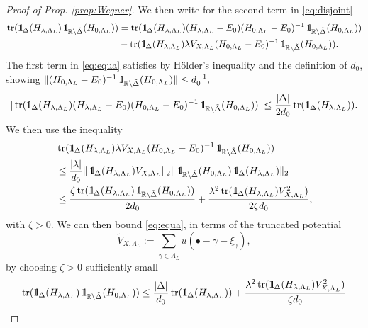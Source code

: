 \documentclass[reqno,12pt,letterpaper]{amsart}
\newcommand{\RR}{{\mathbb R}}
\numberwithin{equation}{section}
\DeclareMathOperator{\tr}{tr}
\def\indic{\operatorname{1\hskip-2.75pt\relax l}}
\begin{document}
\begin{proof}[Proof of Prop. \ref{prop:Wegner}]
We then write for the second term in \eqref{eq:disjoint}
\begin{equation}
\label{eq:equa}
\begin{split}  \tr(\indic_{\Delta}(H_{\lambda,\Lambda_L}) \indic_{\RR \setminus \tilde \Delta}(H_{0,\Lambda_L}) ) &=  \tr(\indic_{\Delta}(H_{\lambda,\Lambda_L})(H_{\lambda,\Lambda_L}-E_0)(H_{0,\Lambda_L}-E_0)^{-1} \indic_{\RR \setminus \tilde \Delta}(H_{0,\Lambda_L}) )\\
&  - \tr(\indic_{\Delta}(H_{\lambda,\Lambda_L})\lambda V_{X,\Lambda_L}(H_{0,\Lambda_L}-E_0)^{-1} \indic_{\RR \setminus \tilde \Delta}(H_{0,\Lambda_L}) ).
\end{split}
\end{equation}
The first term in \eqref{eq:equa} satisfies by H\"older's inequality and the definition of $d_0$, showing $\Vert (H_{0,\Lambda_L}-E_0)^{-1} \indic_{\RR \setminus \tilde \Delta}(H_{0,\Lambda_L}) \Vert \le d_0^{-1},$
\[  \vert \tr(\indic_{\Delta}(H_{\lambda,\Lambda_L})(H_{\lambda,\Lambda_L}-E_0)(H_{0,\Lambda_L}-E_0)^{-1} \indic_{\RR \setminus \tilde \Delta}(H_{0,\Lambda_L}) ) \vert \le \frac{\vert \Delta \vert}{2 d_0} \tr(\indic_{\Delta}(H_{\lambda,\Lambda_L})).\]
We then use the inequality
\[ \begin{split}
& \tr(\indic_{\Delta}(H_{\lambda,\Lambda_L})\lambda V_{X,\Lambda_L}(H_{0,\Lambda_L}-E_0)^{-1} \indic_{\RR \setminus \tilde \Delta}(H_{0,\Lambda_L}) ) \\
&\le \frac{\vert \lambda \vert}{d_0} \Vert \indic_{\Delta}(H_{\lambda,\Lambda_L}) V_{X,\Lambda_L}\Vert_2 \Vert  \indic_{\RR \setminus \tilde \Delta}(H_{0,\Lambda_L}) \indic_{\Delta}(H_{\lambda,\Lambda_L}) \Vert_2  \\
& \le  \frac{\zeta\tr(  \indic_{\Delta}(H_{\lambda,\Lambda_L})\indic_{\RR \setminus \tilde \Delta}(H_{0,\Lambda_L}) )}{2d_0} + \frac{\lambda^2 \tr(  \indic_{\Delta}(H_{\lambda,\Lambda_L})V_{X,\Lambda_L}^2 )}{2\zeta d_0},
\end{split}\]
with $\zeta>0$. We can then bound \eqref{eq:equa}, in terms of the truncated potential
\[\tilde V_{X,\Lambda_L} := \sum_{\gamma \in \tilde\Lambda_L} u(\bullet-\gamma-\xi_{\gamma}),\] 
by choosing $\zeta>0$ sufficiently small 
\begin{equation}
\begin{split}
\label{eq:first_estm}
\tr(\indic_{\Delta}(H_{\lambda,\Lambda_L}) \indic_{\RR \setminus \tilde \Delta}(H_{0,\Lambda_L}) ) 
&\le \frac{\vert \Delta \vert}{d_0} \tr(\indic_{\Delta}(H_{\lambda,\Lambda_L}) ) +  \frac{\lambda^2 \tr(  \indic_{\Delta}(H_{\lambda,\Lambda_L})V_{X,\Lambda_L}^2 )}{\zeta d_0} \\ 

\end{split}
\end{equation}
\end{proof}
\end{document}

